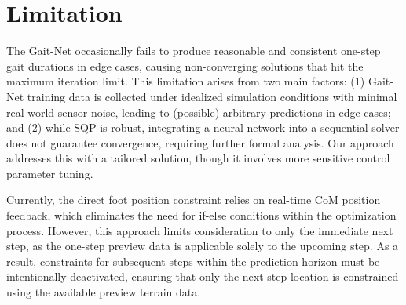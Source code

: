 \section{Limitation}
\label{sec:futureWork}

The Gait-Net occasionally fails to produce reasonable and consistent one-step gait durations in edge cases, causing non-converging solutions that hit the maximum iteration limit. This limitation arises from two main factors: (1) Gait-Net training data is collected under idealized simulation conditions with minimal real-world sensor noise, leading to (possible) arbitrary predictions in edge cases; and (2) while SQP is robust, integrating a neural network into a sequential solver does not guarantee convergence, requiring further formal analysis. Our approach addresses this with a tailored solution, though it involves more sensitive control parameter tuning.

Currently, the direct foot position constraint relies on real-time CoM position feedback, which eliminates the need for if-else conditions within the optimization process. However, this approach limits consideration to only the immediate next step, as the one-step preview data is applicable solely to the upcoming step. As a result, constraints for subsequent steps within the prediction horizon must be intentionally deactivated, ensuring that only the next step location is constrained using the available preview terrain data.